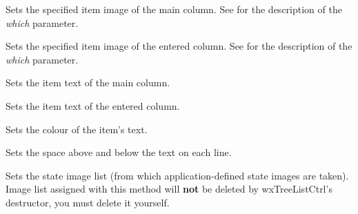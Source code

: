 \label{wxtreelistctrlsetitemimage}


Sets the specified item image of the main column. See 
for the description of the {\it which} parameter.


Sets the specified item image of the entered column. See 
for the description of the {\it which} parameter.

\label{wxtreelistctrlsetitemtext}


Sets the item text of the main column.


Sets the item text of the entered column.

\label{wxtreelistctrlsetitemtextcolour}


Sets the colour of the item's text.

\label{wxtreelistctrlsetindent}


Sets the space above and below the text on each line.

\label{wxtreelistctrlsetstateimagelist}


Sets the state image list (from which application-defined state images are taken).
Image list assigned with this method will
{\bf not} be deleted by wxTreeListCtrl's destructor, you must delete it yourself.

